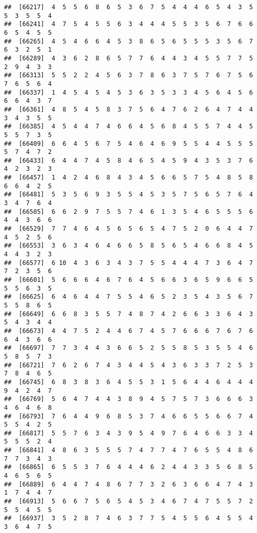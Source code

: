 \documentclass[
]{book}
\begin{document}
\begin{verbatim}
##  [66217]  4  5  5  6  8  6  5  3  6  7  5  4  4  4  6  5  4  3  5  5  3  5  5  4
##  [66241]  4  7  5  4  5  5  6  3  4  4  4  5  5  3  5  6  7  6  6  6  5  4  5  5
##  [66265]  4  5  4  6  6  4  5  3  8  6  5  6  5  5  5  3  5  6  7  6  3  2  5  1
##  [66289]  4  3  6  2  8  6  5  7  7  6  4  4  3  4  5  5  7  7  5  2  9  4  3  3
##  [66313]  5  5  2  2  4  5  6  3  7  8  6  3  7  5  7  6  7  5  6  7  6  5  6  4
##  [66337]  1  4  5  4  5  4  5  3  6  3  5  3  3  4  5  6  4  5  6  6  6  4  3  7
##  [66361]  4  8  5  4  5  8  3  7  5  6  4  7  6  2  6  4  7  4  4  3  4  3  5  5
##  [66385]  4  5  4  4  7  4  6  6  4  5  6  8  4  5  5  7  4  4  5  5  5  7  3  5
##  [66409]  6  6  4  5  6  7  5  4  6  4  6  9  5  5  4  4  5  5  5  5  7  4  7  2
##  [66433]  6  4  4  7  4  5  8  4  6  5  4  5  9  4  3  5  3  7  6  4  2  3  2  3
##  [66457]  1  4  2  4  6  8  4  3  4  5  6  6  5  7  5  4  8  5  8  6  6  4  2  5
##  [66481]  5  3  5  6  9  3  5  5  4  5  3  5  7  5  6  5  7  6  4  3  4  7  6  4
##  [66505]  6  6  2  9  7  5  5  7  4  6  1  3  5  4  6  5  5  5  6  4  4  3  6  6
##  [66529]  7  7  4  6  4  5  6  5  6  5  4  7  5  2  0  6  4  4  7  4  5  2  5  6
##  [66553]  3  6  3  4  6  4  6  6  5  8  5  6  5  4  6  6  8  4  5  4  4  3  2  3
##  [66577]  6 10  4  3  6  3  4  3  7  5  5  4  4  4  7  3  6  4  7  7  2  3  5  6
##  [66601]  5  6  6  6  4  6  7  6  4  5  6  6  3  6  5  9  6  6  5  5  5  6  3  5
##  [66625]  6  4  6  4  4  7  5  5  4  6  5  2  3  5  4  3  5  6  7  5  5  8  6  5
##  [66649]  6  6  8  3  5  5  7  4  8  7  4  2  6  6  3  3  6  4  3  5  4  3  4  4
##  [66673]  4  4  7  5  2  4  4  6  7  4  5  7  6  6  6  7  6  7  6  6  4  3  6  6
##  [66697]  7  7  3  4  4  3  6  6  5  2  5  5  8  5  3  5  5  4  6  5  8  5  7  3
##  [66721]  7  6  2  6  7  4  3  4  4  5  4  3  6  3  3  7  2  5  3  7  8  4  6  5
##  [66745]  6  8  3  8  3  6  4  5  5  3  1  5  6  4  4  6  4  4  4  9  4  2  4  7
##  [66769]  5  6  4  7  4  4  3  8  9  4  5  7  5  7  3  6  6  6  3  4  6  4  6  8
##  [66793]  7  6  4  4  9  6  8  5  3  7  4  6  6  5  5  6  6  7  4  5  5  4  2  5
##  [66817]  5  5  7  6  3  4  3  9  5  4  9  7  6  4  6  6  3  3  4  5  5  5  2  4
##  [66841]  4  8  6  3  5  5  5  7  4  7  7  4  7  6  5  5  4  8  6  7  7  3  4  3
##  [66865]  6  5  5  3  7  6  4  4  4  6  2  4  4  3  3  5  6  8  5  4  6  5  6  5
##  [66889]  6  4  4  7  4  8  6  7  7  3  2  6  3  6  6  4  7  4  3  1  7  4  4  7
##  [66913]  5  6  6  7  5  6  5  4  5  3  4  6  7  4  7  5  5  7  2  5  5  4  5  5
##  [66937]  3  5  2  8  7  4  6  3  7  7  5  4  5  5  6  4  5  5  4  3  6  4  7  5

\end{verbatim}
\end{document}
